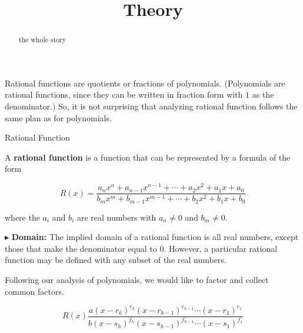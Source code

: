 \documentclass{ximera}
\title{Theory}
\begin{document}
\begin{abstract}
the whole story
\end{abstract}
\maketitle









Rational functions are quotients or fractions of polynomials.  (Polynomials are rational functions, since they can be written in fraction form with $1$ as the denominator.)  So, it is not surprising that analyzing rational function follows the same plan as for polynomials.



















\begin{definition} Rational Function


A \textbf{rational function} is a function that can be represented by a formula of the form


\[   R(x) = \frac{a_n x^n + a_{n-1} x^{n-1} + \cdots + a_2 x^2 + a_1 x + a_0}{b_m x^m + b_{m-1} x^{m-1} + \cdots + b_2 x^2 + b_1 x + b_0}        \]

where the $a_i$ and $b_i$ are real numbers with $a_n \ne 0$ and $b_m \ne 0$.


\end{definition}



$\blacktriangleright$ \textbf{Domain:} The implied domain of a rational function is all real numbers, except those that make the denominator equal to $0$.  However, a particular rational function may be defined with any subset of the real numbers.








Following our analysis of polynomials, we would like to factor and collect common factors.


\[  R(x)   \frac{a (x - r_k)^{e_k} (x - r_{k-1})^{e_{k-1}} \cdots (x - r_1)^{e_1} }{b (x - s_h)^{f_h} (x - s_{h-1})^{f_{h-1}} \cdots (x - s_1)^{f_1}}            \]
\end{document}
